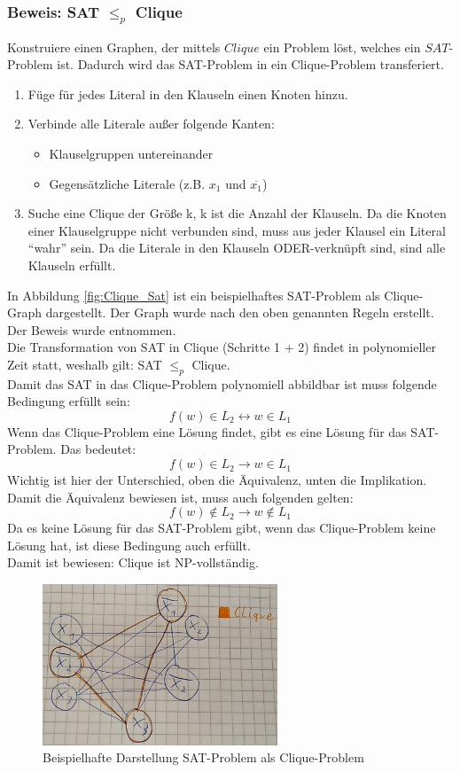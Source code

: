 \documentclass[ngerman]{article}
\begin{document}
\subsubsection{Beweis: SAT $\le_p$ Clique}
\label{sec:SAT_Clique}
Konstruiere einen Graphen, der mittels \(Clique\) ein Problem löst, welches ein \(SAT\)-Problem ist.
Dadurch wird das SAT-Problem in ein Clique-Problem transferiert.
\begin{enumerate}
\item Füge für jedes Literal in den Klauseln einen Knoten hinzu.
\item Verbinde alle Literale außer folgende Kanten:
\begin{itemize}
\item Klauselgruppen untereinander
\item Gegensätzliche Literale (z.B. \(x_1\) und \(\overline{x_1}\))
\end{itemize}
\item Suche eine Clique der Größe k, k ist die Anzahl der Klauseln.
Da die Knoten einer Klauselgruppe nicht verbunden sind, muss aus jeder Klausel ein Literal ``wahr'' sein.
Da die Literale in den Klauseln ODER-verknüpft sind, sind alle Klauseln erfüllt.\\
\end{enumerate}
In Abbildung \vref{fig:Clique_Sat} ist ein beispielhaftes SAT-Problem als Clique-Graph dargestellt.
Der Graph wurde nach den oben genannten Regeln erstellt.
Der Beweis wurde \cite{weitz} entnommen.\\
Die Transformation von SAT in Clique (Schritte 1 + 2) findet in polynomieller Zeit statt, weshalb gilt: SAT $\le_p$ Clique.\\
Damit das SAT in das Clique-Problem polynomiell abbildbar ist muss folgende Bedingung erfüllt sein:
$$f(w) \in L_2 \leftrightarrow w \in L_1$$
Wenn das Clique-Problem eine Lösung findet, gibt es eine Lösung für das SAT-Problem. Das bedeutet:
$$f(w) \in L_2 \rightarrow w \in L_1$$
Wichtig ist hier der Unterschied, oben die Äquivalenz, unten die Implikation. Damit die Äquivalenz bewiesen ist, muss auch folgenden gelten:
$$f(w) \notin L_2 \rightarrow w \notin L_1$$
Da es keine Lösung für das SAT-Problem gibt, wenn das Clique-Problem keine Lösung hat, ist diese Bedingung auch erfüllt.\\
Damit ist bewiesen: Clique ist NP-vollständig.
\begin{figure}[H]
	\centering
	\includegraphics[width=7cm]{figures/clique_sat.png}
	\caption{Beispielhafte Darstellung SAT-Problem als Clique-Problem}
	\label{fig:Clique_Sat}
\end{figure}
\end{document}

